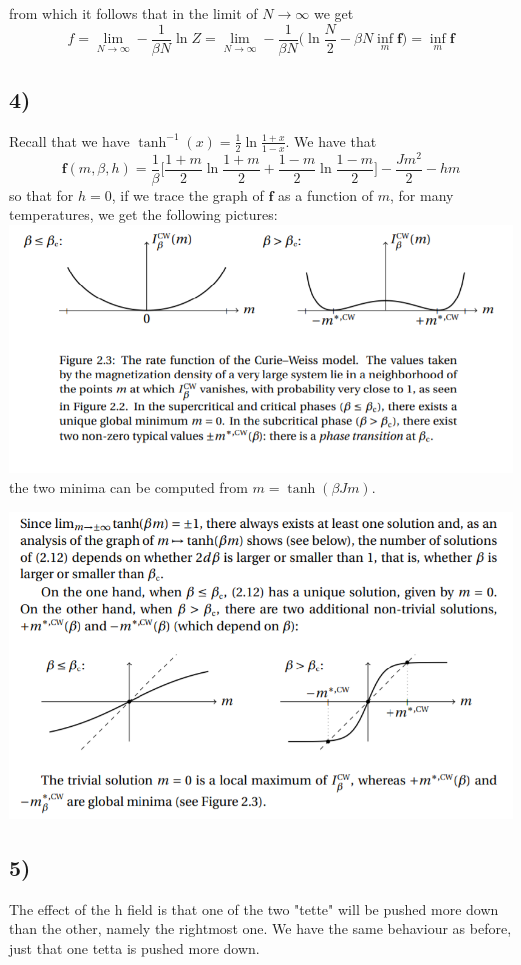 \documentclass[10pt,a4paper]{book}
\begin{document}
from which it follows that in the limit of $N\to\infty$ we get
$$f=\lim_{N\to\infty}-\frac{1}{\beta N}\ln Z=\lim_{N\to\infty}-\frac{1}{\beta N}\bigg(\ln\frac{N}{2}-\beta N\inf_m\mathbf{f}\bigg)=\inf_m\mathbf{f}$$

\subsection*{4)}
Recall that we have $\tanh^{-1}(x)=\frac{1}{2}\ln\frac{1+x}{1-x}$.
We have that $$\mathbf{f}(m,\beta,h)=\frac{1}{\beta}\bigg[\frac{1+m}{2}\ln\frac{1+m}{2}+\frac{1-m}{2}\ln\frac{1-m}{2}\bigg]-\frac{Jm^2}{2}-hm
$$
so that for $h=0$, if we trace the graph of $\mathbf{f}$ as a function of $m$, for many temperatures, we get the following pictures:\\
\includegraphics[scale=0.5]{TD1}\\

the two minima can be computed from $m=\tanh(\beta Jm)$. 

\includegraphics[scale=0.5]{TD3}

\subsection*{5)}
The effect of the h field is that one of the two "tette" will be pushed more down than the other, namely the rightmost one. We have the same behaviour as before, just that one tetta is pushed more down.
\end{document}
